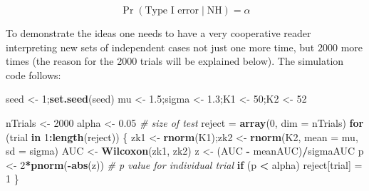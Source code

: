 \documentclass[
]{book}
\newenvironment{Shaded}{\begin{snugshade}}{\end{snugshade}}
\newcommand{\CommentTok}[1]{\textcolor[rgb]{0.56,0.35,0.01}{\textit{#1}}}
\newcommand{\ControlFlowTok}[1]{\textcolor[rgb]{0.13,0.29,0.53}{\textbf{#1}}}
\newcommand{\DataTypeTok}[1]{\textcolor[rgb]{0.13,0.29,0.53}{#1}}
\newcommand{\DecValTok}[1]{\textcolor[rgb]{0.00,0.00,0.81}{#1}}
\newcommand{\FloatTok}[1]{\textcolor[rgb]{0.00,0.00,0.81}{#1}}
\newcommand{\KeywordTok}[1]{\textcolor[rgb]{0.13,0.29,0.53}{\textbf{#1}}}
\newcommand{\NormalTok}[1]{#1}
\newcommand{\OperatorTok}[1]{\textcolor[rgb]{0.81,0.36,0.00}{\textbf{#1}}}
\newcommand{\StringTok}[1]{\textcolor[rgb]{0.31,0.60,0.02}{#1}}
\begin{document}
\begin{equation*} 
\Pr( \text{Type I error} \mid \text{NH} )=\alpha
\end{equation*}

To demonstrate the ideas one needs to have a very cooperative reader interpreting new sets of independent cases not just one more time, but 2000 more times (the reason for the 2000 trials will be explained below). The simulation code follows:

\begin{Shaded}
\begin{Highlighting}[]
\NormalTok{seed \textless{}{-}}\StringTok{ }\DecValTok{1}\NormalTok{;}\KeywordTok{set.seed}\NormalTok{(seed)}
\NormalTok{mu \textless{}{-}}\StringTok{ }\FloatTok{1.5}\NormalTok{;sigma \textless{}{-}}\StringTok{ }\FloatTok{1.3}\NormalTok{;K1 \textless{}{-}}\StringTok{ }\DecValTok{50}\NormalTok{;K2 \textless{}{-}}\StringTok{ }\DecValTok{52}

\NormalTok{nTrials \textless{}{-}}\StringTok{ }\DecValTok{2000}
\NormalTok{alpha \textless{}{-}}\StringTok{ }\FloatTok{0.05} \CommentTok{\# size of test}
\NormalTok{reject =}\StringTok{ }\KeywordTok{array}\NormalTok{(}\DecValTok{0}\NormalTok{, }\DataTypeTok{dim =}\NormalTok{ nTrials)}
\ControlFlowTok{for}\NormalTok{ (trial }\ControlFlowTok{in} \DecValTok{1}\OperatorTok{:}\KeywordTok{length}\NormalTok{(reject)) \{  }
\NormalTok{  zk1 \textless{}{-}}\StringTok{ }\KeywordTok{rnorm}\NormalTok{(K1);zk2 \textless{}{-}}\StringTok{ }\KeywordTok{rnorm}\NormalTok{(K2, }\DataTypeTok{mean =}\NormalTok{ mu, }\DataTypeTok{sd =}\NormalTok{ sigma)  }
\NormalTok{  AUC \textless{}{-}}\StringTok{ }\KeywordTok{Wilcoxon}\NormalTok{(zk1, zk2)  }
\NormalTok{  z \textless{}{-}}\StringTok{ }\NormalTok{(AUC }\OperatorTok{{-}}\StringTok{ }\NormalTok{meanAUC)}\OperatorTok{/}\NormalTok{sigmaAUC}
\NormalTok{  p \textless{}{-}}\StringTok{ }\DecValTok{2}\OperatorTok{*}\KeywordTok{pnorm}\NormalTok{(}\OperatorTok{{-}}\KeywordTok{abs}\NormalTok{(z)) }\CommentTok{\# p value for individual trial}
  \ControlFlowTok{if}\NormalTok{ (p }\OperatorTok{\textless{}}\StringTok{ }\NormalTok{alpha) reject[trial] =}\StringTok{ }\DecValTok{1} 
\NormalTok{\}}


\end{Highlighting}
\end{Shaded}
\end{document}

